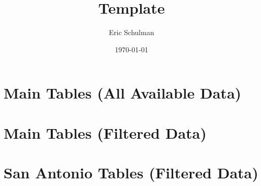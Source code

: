 \documentclass{article}
\title{Template}
\author{Eric Schulman}
\date{\today}
\begin{document}
\section{Main Tables (All Available Data)}





\pagebreak

\section{Main Tables (Filtered Data)}





\pagebreak

\section{San Antonio Tables (Filtered Data)}






\end{document}
